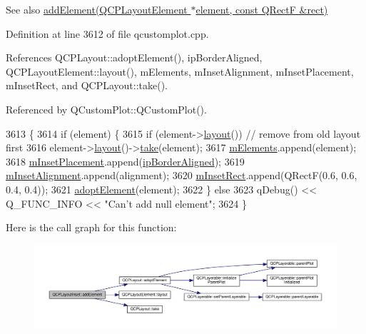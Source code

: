 \begin{DoxySeeAlso}{See also}
\hyperlink{class_q_c_p_layout_inset_a8ff61fbee4a1f0ff45c398009d9f1e56}{add\+Element(\+Q\+C\+P\+Layout\+Element $\ast$element, const Q\+Rect\+F \&rect)} 
\end{DoxySeeAlso}


Definition at line 3612 of file qcustomplot.\+cpp.



References Q\+C\+P\+Layout\+::adopt\+Element(), ip\+Border\+Aligned, Q\+C\+P\+Layout\+Element\+::layout(), m\+Elements, m\+Inset\+Alignment, m\+Inset\+Placement, m\+Inset\+Rect, and Q\+C\+P\+Layout\+::take().



Referenced by Q\+Custom\+Plot\+::\+Q\+Custom\+Plot().


\begin{DoxyCode}
3613                                                        \{
3614   \textcolor{keywordflow}{if} (element) \{
3615     \textcolor{keywordflow}{if} (element->\hyperlink{class_q_c_p_layout_element_a6235f5384db871fc6e3387a1bc558b0d}{layout}()) \textcolor{comment}{// remove from old layout first}
3616       element->\hyperlink{class_q_c_p_layout_element_a6235f5384db871fc6e3387a1bc558b0d}{layout}()->\hyperlink{class_q_c_p_layout_ada26cd17e56472b0b4d7fbbc96873e4c}{take}(element);
3617     \hyperlink{class_q_c_p_layout_inset_a7e618ac870f69f2fe2eae2a04500e763}{mElements}.append(element);
3618     \hyperlink{class_q_c_p_layout_inset_a57a0a4e445cc78eada29765ecf092abe}{mInsetPlacement}.append(\hyperlink{class_q_c_p_layout_inset_a8b9e17d9a2768293d2a7d72f5e298192aa81e7df4a785ddee2229a8f47c46e817}{ipBorderAligned});
3619     \hyperlink{class_q_c_p_layout_inset_a55e9b84c310136ff985a6544184ab64a}{mInsetAlignment}.append(alignment);
3620     \hyperlink{class_q_c_p_layout_inset_aaa8f6b5029458f3d97a65239524a2b33}{mInsetRect}.append(QRectF(0.6, 0.6, 0.4, 0.4));
3621     \hyperlink{class_q_c_p_layout_af6dbbc24156a808da29cd1ec031729a3}{adoptElement}(element);
3622   \} \textcolor{keywordflow}{else}
3623     qDebug() << Q\_FUNC\_INFO << \textcolor{stringliteral}{"Can't add null element"};
3624 \}
\end{DoxyCode}


Here is the call graph for this function\+:\nopagebreak
\begin{figure}[H]
\begin{center}
\leavevmode
\includegraphics[width=350pt]{class_q_c_p_layout_inset_ad61529eb576af7f04dff94abb10c745a_cgraph}
\end{center}
\end{figure}




